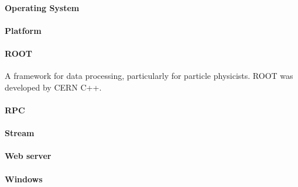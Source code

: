 \paragraph{Operating System}

\paragraph{Platform}

\paragraph{ROOT}
A framework for data processing, particularly for particle physicists. ROOT was developed by CERN C++.


\paragraph{RPC}

\paragraph{Stream}

\paragraph{Web server}

\paragraph{Windows}
